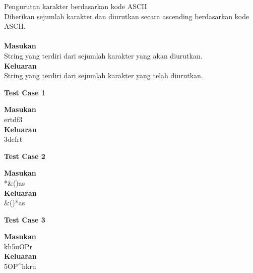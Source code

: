 \newpage
\begin{permasalahan}{Pengurutan karakter berdasarkan kode ASCII}\\
Diberikan sejumlah karakter dan diurutkan secara ascending berdasarkan kode ASCII.\\
	\\
	\textbf{Masukan}\\
	String yang terdiri dari sejumlah karakter yang akan diurutkan.\\
	\textbf{Keluaran}\\
	String yang terdiri dari sejumlah karakter yang telah diurutkan.\\
	\begin{center}
	\textbf{Test Case 1}\\
	\end{center}
	\textbf{Masukan}\\
ertdf3\\

	\textbf{Keluaran}\\
3defrt\\
	\begin{center}
	\textbf{Test Case 2}\\
	\end{center}
	\textbf{Masukan}\\
*\&()as\\

	\textbf{Keluaran}\\
\&()*as\\
	\begin{center}
	\textbf{Test Case 3}\\
	\end{center}
	\textbf{Masukan}\\
kh5uOPr\^\\

	\textbf{Keluaran}\\
5OP\^{}hkru\\
\end{permasalahan}
